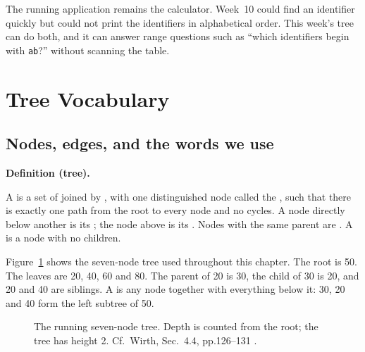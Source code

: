 \documentclass[11pt]{article}
\theoremstyle{definition}
\newenvironment{definitionbox}[1]{%
  \par\noindent\textbf{Definition (#1).}\ \itshape
}{\par\vspace{0.3em}}
\begin{document}
The running application remains the calculator. Week~10 could find an
identifier quickly but could not print the identifiers in alphabetical order.
This week's tree can do both, and it can answer range questions such as
``which identifiers begin with \texttt{ab}?'' without scanning the table.

\section{Tree Vocabulary}

\subsection{Nodes, edges, and the words we use}

\begin{definitionbox}{tree}
A  is a set of  joined by , with one
distinguished node called the , such that there is exactly one path
from the root to every node and no cycles. A node directly below another is
its ; the node above is its . Nodes with the same
parent are . A  is a node with no children.
\end{definitionbox}

Figure~\ref{fig:anatomy} shows the seven-node tree used throughout this
chapter. The root is 50. The leaves are 20, 40, 60 and 80. The parent of 20
is 30, the child of 30 is 20, and 20 and 40 are siblings. A  is
any node together with everything below it: 30, 20 and 40 form the left
subtree of 50.

\begin{figure}[h]
  \centering
  \caption{The running seven-node tree. Depth is counted from the root; the
    tree has height 2. Cf.\ Wirth, Sec.~4.4, pp.126--131
    \cite{Wirth2004_algorithms_data_structures}.}
  \label{fig:anatomy}
\end{figure}
\end{document}
